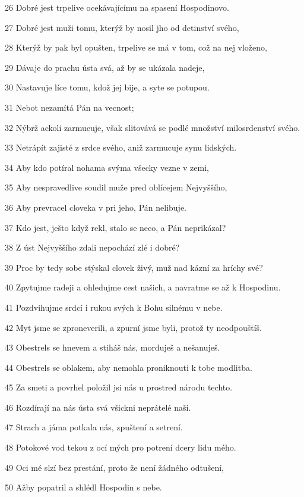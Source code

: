\par 26 Dobré jest trpelive ocekávajícímu na spasení Hospodinovo.
\par 27 Dobré jest muži tomu, kterýž by nosil jho od detinství svého,
\par 28 Kterýž by pak byl opušten, trpelive se má v tom, což na nej vloženo,
\par 29 Dávaje do prachu ústa svá, až by se ukázala nadeje,
\par 30 Nastavuje líce tomu, kdož jej bije, a syte se potupou.
\par 31 Nebot nezamítá Pán na vecnost;
\par 32 Nýbrž ackoli zarmucuje, však slitovává se podlé množství milosrdenství svého.
\par 33 Netrápít zajisté z srdce svého, aniž zarmucuje synu lidských.
\par 34 Aby kdo potíral nohama svýma všecky vezne v zemi,
\par 35 Aby nespravedlive soudil muže pred oblícejem Nejvyššího,
\par 36 Aby prevracel cloveka v pri jeho, Pán nelibuje.
\par 37 Kdo jest, ješto když rekl, stalo se neco, a Pán neprikázal?
\par 38 Z úst Nejvyššího zdali nepochází zlé i dobré?
\par 39 Proc by tedy sobe stýskal clovek živý, muž nad kázní za hríchy své?
\par 40 Zpytujme radeji a ohledujme cest našich, a navratme se až k Hospodinu.
\par 41 Pozdvihujme srdcí i rukou svých k Bohu silnému v nebe.
\par 42 Myt jsme se zproneverili, a zpurní jsme byli, protož ty neodpouštíš.
\par 43 Obestrels se hnevem a stiháš nás, morduješ a nešanuješ.
\par 44 Obestrels se oblakem, aby nemohla proniknouti k tobe modlitba.
\par 45 Za smeti a povrhel položil jsi nás u prostred národu techto.
\par 46 Rozdírají na nás ústa svá všickni neprátelé naši.
\par 47 Strach a jáma potkala nás, zpuštení a setrení.
\par 48 Potokové vod tekou z ocí mých pro potrení dcery lidu mého.
\par 49 Oci mé slzí bez prestání, proto že není žádného odtušení,
\par 50 Ažby popatril a shlédl Hospodin s nebe.
